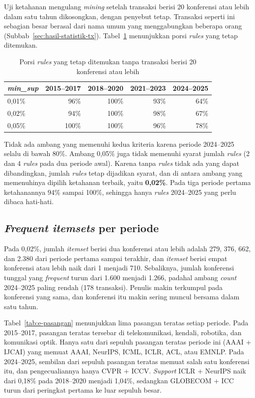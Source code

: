Uji ketahanan mengulang \textit{mining} setelah transaksi berisi 20 konferensi atau lebih dalam satu tahun dikosongkan, dengan penyebut tetap. Transaksi seperti ini sebagian besar berasal dari nama umum yang menggabungkan beberapa orang (Subbab~\ref{sec:hasil-statistik-tx}). Tabel~\ref{tab:e-tahan} menunjukkan porsi \textit{rules} yang tetap ditemukan.

\begin{table}[ht]
\caption{Porsi \textit{rules} yang tetap ditemukan tanpa transaksi berisi 20 konferensi atau lebih}
\label{tab:e-tahan}
\small
\begin{tabular}{@{}lrrrr@{}}
\toprule
\textbf{\textit{min\_sup}} & \textbf{2015--2017} & \textbf{2018--2020} & \textbf{2021--2023} & \textbf{2024--2025} \\
\midrule
0,01\% & 96\% & 100\% & 93\% & 64\% \\
0,02\% & 94\% & 100\% & 98\% & 67\% \\
0,05\% & 100\% & 100\% & 96\% & 78\% \\
\bottomrule
\end{tabular}
\end{table}

Tidak ada ambang yang memenuhi kedua kriteria karena periode 2024--2025 selalu di bawah 80\%. Ambang 0,05\% juga tidak memenuhi syarat jumlah \textit{rules} (2 dan 4 \textit{rules} pada dua periode awal). Karena tanpa \textit{rules} tidak ada yang dapat dibandingkan, jumlah \textit{rules} tetap dijadikan syarat, dan di antara ambang yang memenuhinya dipilih ketahanan terbaik, yaitu \textbf{0,02\%}. Pada tiga periode pertama ketahanannya 94\% sampai 100\%, sehingga hanya \textit{rules} 2024--2025 yang perlu dibaca hati-hati.

\subsection{\textit{Frequent itemsets} per periode}
\label{sec:hasil-e-fpm}
Pada 0,02\%, jumlah \textit{itemset} berisi dua konferensi atau lebih adalah 279, 376, 662, dan 2.380 dari periode pertama sampai terakhir, dan \textit{itemset} berisi empat konferensi atau lebih naik dari 1 menjadi 710. Sebaliknya, jumlah konferensi tunggal yang \textit{frequent} turun dari 1.600 menjadi 1.266, padahal ambang \textit{count} 2024--2025 paling rendah (178 transaksi). Penulis makin terkumpul pada konferensi yang sama, dan konferensi itu makin sering muncul bersama dalam satu tahun.

Tabel~\ref{tab:e-pasangan} menunjukkan lima pasangan teratas setiap periode. Pada 2015--2017, pasangan teratas tersebar di telekomunikasi, kendali, robotika, dan komunikasi optik. Hanya satu dari sepuluh pasangan teratas periode ini (AAAI + IJCAI) yang memuat AAAI, NeurIPS, ICML, ICLR, ACL, atau EMNLP. Pada 2024--2025, sembilan dari sepuluh pasangan teratas memuat salah satu konferensi itu, dan pengecualiannya hanya CVPR + ICCV. \textit{Support} ICLR + NeurIPS naik dari 0,18\% pada 2018--2020 menjadi 1,04\%, sedangkan GLOBECOM + ICC turun dari peringkat pertama ke luar sepuluh besar.

